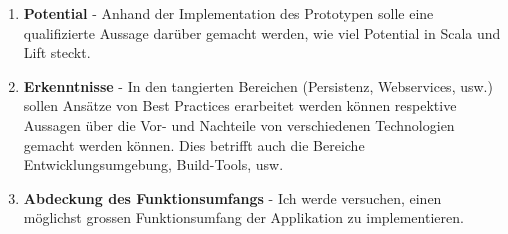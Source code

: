 \begin{enumerate}
\item \textbf{Potential} - Anhand der Implementation des Prototypen solle eine qualifizierte Aussage dar\"uber gemacht werden, wie viel Potential in Scala und Lift steckt. 

\item \textbf{Erkenntnisse} - In den tangierten Bereichen (Persistenz, Webservices, usw.) sollen Ans\"atze von Best Practices erarbeitet werden k\"onnen respektive Aussagen \"uber die Vor- und Nachteile von verschiedenen Technologien gemacht werden k\"onnen. Dies betrifft auch die Bereiche Entwicklungsumgebung, Build-Tools, usw.

\item \textbf{Abdeckung des Funktionsumfangs} - Ich werde versuchen, einen m\"oglichst grossen Funktionsumfang der Applikation zu implementieren.
\end{enumerate}






